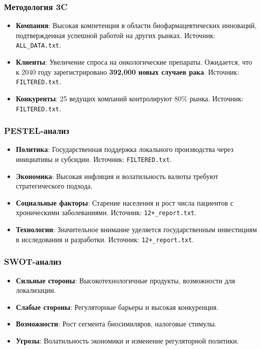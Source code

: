 \documentclass[a4paper,12pt]{article}
\begin{document}
\subsubsection{Методология 3C}
\begin{itemize}
    \item \textbf{Компания}: Высокая компетенция в области биофармацевтических инноваций, подтвержденная успешной работой на других рынках. Источник: \texttt{ALL\_DATA.txt}.
    \item \textbf{Клиенты}: Увеличение спроса на онкологические препараты. Ожидается, что к 2040 году зарегистрировано \textbf{392,000 новых случаев рака}. Источник: \texttt{FILTERED.txt}.
    \item \textbf{Конкуренты}: 25 ведущих компаний контролируют 80\% рынка. Источник: \texttt{FILTERED.txt}.
\end{itemize}

\subsubsection{PESTEL-анализ}
\begin{itemize}
    \item \textbf{Политика}: Государственная поддержка локального производства через инициативы и субсидии. Источник: \texttt{FILTERED.txt}.
    \item \textbf{Экономика}: Высокая инфляция и волатильность валюты требуют стратегического подхода.
    \item \textbf{Социальные факторы}: Старение населения и рост числа пациентов с хроническими заболеваниями. Источник: \texttt{12+\_report.txt}.
    \item \textbf{Технологии}: Значительное внимание уделяется государственным инвестициям в исследования и разработки. Источник: \texttt{12+\_report.txt}.
\end{itemize}

\subsubsection{SWOT-анализ}
\begin{itemize}
    \item \textbf{Сильные стороны}: Высокотехнологичные продукты, возможности для локализации.
    \item \textbf{Слабые стороны}: Регуляторные барьеры и высокая конкуренция.
    \item \textbf{Возможности}: Рост сегмента биосимиляров, налоговые стимулы.
    \item \textbf{Угрозы}: Волатильность экономики и изменение регуляторной политики.
\end{itemize}
\end{document}
